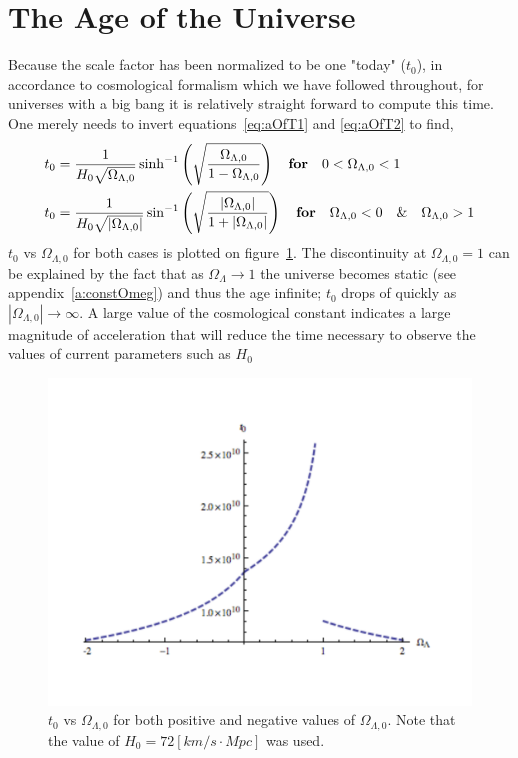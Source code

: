 \documentclass[twoside]{article}
\begin{document}
\section{The Age of the Universe}
Because the scale factor has been normalized to be one "today" ($t_{0}$), in accordance to cosmological formalism which we have followed throughout, for universes with a big bang it is relatively straight forward to compute this time. One merely needs to invert equations~\ref{eq:aOfT1} and \ref{eq:aOfT2} to find,
\begin{align}
&t_{0} = \frac{1}{H_{0}\sqrt{\Omega_{\Lambda,0}}}\sinh^{-1}\left(\sqrt{\frac{\Omega_{\Lambda,0}}{1-\Omega_{\Lambda,0}} }\right)\quad \text{\textbf{for}}\quad 0<\Omega_{\Lambda,0}<1\\
&t_{0} = \frac{1}{H_{0}\sqrt{|\Omega_{\Lambda,0}|}}\sin^{-1}\left(\sqrt{\frac{|\Omega_{\Lambda,0}|}{1+|\Omega_{\Lambda,0}|} }\right)\quad \text{\textbf{for}}\quad \Omega_{\Lambda,0}<0\quad\&\quad \Omega_{\Lambda,0}>1
\end{align}
$t_{0}$ vs $\Omega_{\Lambda,0}$ for both cases is plotted on figure~\ref{f:t0vsOmeg}. The discontinuity at $\Omega_{\Lambda,0} = 1$ can be explained by the fact that as $\Omega_{\Lambda}\rightarrow 1$ the universe becomes static (see appendix~\ref{a:constOmeg}) and thus the age infinite; $t_{0}$ drops of quickly  as $|\Omega_{\Lambda,0}|\rightarrow\infty$. A large value of the cosmological constant indicates a large magnitude of acceleration that will reduce the time necessary to observe the values of current parameters such as $H_{0}$
\begin{figure}[h!]
  \centering
      \includegraphics[width=1\textwidth]{tvsOmega.pdf}
  \caption{$t_{0}$ vs $\Omega_{\Lambda,0}$ for both positive and negative values of $\Omega_{\Lambda,0}$. Note that the value of $H_{0} = 72 [km/s\cdot Mpc]$ was used.}\label{f:t0vsOmeg}
\end{figure}
\end{document}
